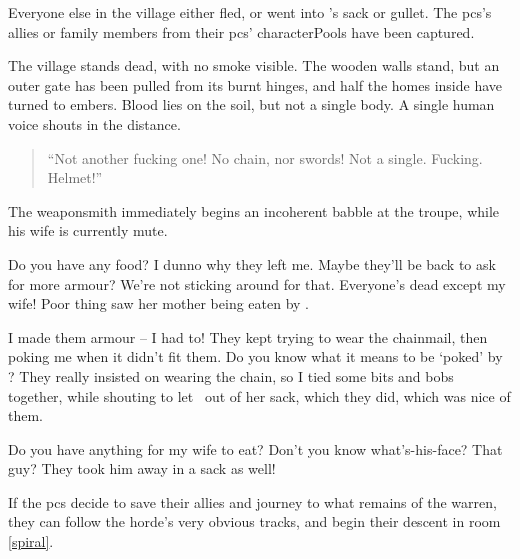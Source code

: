 Everyone else in the \gls{village} either fled, or went into 's sack or gullet.
The \glspl{pc}'s allies or family members from their \glspl{pc}' \glspl{characterPool} have been captured.

\begin{boxtext}
  The \gls{village} stands dead, with no smoke visible.
  The wooden walls stand, but an outer gate has been pulled from its burnt hinges, and half the homes inside have turned to embers.
  Blood lies on the soil, but not a single body.
  A single human voice shouts in the distance.

  \begin{quotation}
    ``Not another fucking one!
    No chain, nor swords!
    Not a single. Fucking. Helmet!''
  \end{quotation}
\end{boxtext}


The weaponsmith immediately begins an incoherent babble at the troupe, while his wife is currently mute.

\begin{speechtext}
  Do you have any food?
  I dunno why they left me.
  Maybe they'll be back to ask for more armour?
  We're not sticking around for that.
  Everyone's dead except my wife!
  Poor thing saw her mother being eaten by .

  I made them armour -- I had to!
  They kept trying to wear the chainmail, then poking me when it didn't fit them.
  Do you know what it means to be `poked' by ?
  They really insisted on wearing the chain, so I tied some bits and bobs together, while shouting to let \composeHumanName\ out of her sack, which they did, which was nice of them.

  Do you have anything for my wife to eat?
  Don't you know what's-his-face?
  That guy?
  They took him away in a sack as well!
\end{speechtext}

If the \glspl{pc} decide to save their allies and journey to what remains of the \gls{warren}, they can follow the horde's very obvious tracks, and begin their descent in room \vref{spiral}.
